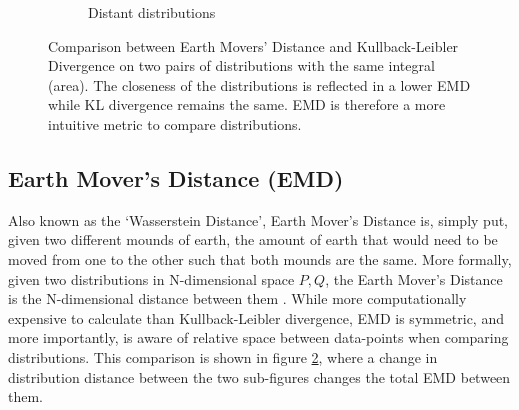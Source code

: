 \begin{figure}[h!]
\begin{subfigure}{.5\textwidth}
        \caption{Distant distributions}
        \label{fig:fardist}
    \end{subfigure}
    \caption[Comparison between Earth Mover Distance and Kullback-Leibler Divergence]{Comparison between Earth Movers' Distance and Kullback-Leibler Divergence on two pairs of distributions with the same integral (area). The closeness of the distributions is reflected in a lower EMD while KL divergence remains the same. EMD is therefore a more intuitive metric to compare distributions.}
    \label{fig:distributioncompKLEMD}
\end{figure}

\subsection{Earth Mover's Distance (EMD)}

Also known as the `Wasserstein Distance', Earth Mover's Distance is, simply put,
given two different mounds of earth, the amount of earth that would need to be
moved from one to the other such that both mounds are the same. More formally,
given two distributions in N-dimensional space $P, Q$, the Earth Mover's
Distance is the N-dimensional distance between them \autocite{pele_fast_2009}. While more computationally
expensive to calculate than Kullback-Leibler divergence, EMD is symmetric, and
more importantly, is aware of relative space between data-points when comparing
distributions. This comparison is shown in figure
\ref{fig:distributioncompKLEMD}, where a change in distribution distance between
the two sub-figures changes the total EMD between them.